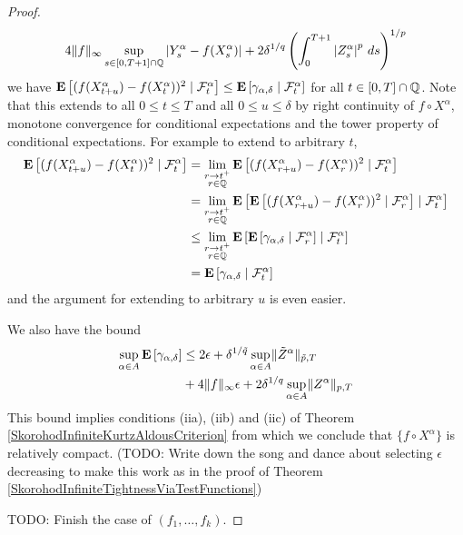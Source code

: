 \begin{proof}
\begin{align*}
4 \norm{f}_\infty \sup_{s \in [0,T+1] \cap \rationals} \abs{Y^\alpha_s - f(X^\alpha_s)} + 
2 \delta^{1/q} \left(\int_0^{T+1} \abs{Z^\alpha_s}^{p} \, ds\right)^{1/p}
\end{align*}
we have $\cexpectationlong{\mathcal{F}^\alpha_t}{(f(X^\alpha_{t+u}) - f(X^\alpha_t))^2} \leq \cexpectationlong{\mathcal{F}^\alpha_t}{\gamma_{\alpha, \delta}}$  for all 
$t \in [0,T] \cap \rationals$.  Note that this extends to all $0 \leq t \leq T$ and all $0 \leq u \leq \delta$ by right continuity of $f \circ X^\alpha$, monotone convergence for conditional expectations and the tower property of conditional expectations.  For example to extend to arbitrary $t$,
\begin{align*}
\cexpectationlong{\mathcal{F}^\alpha_t}{(f(X^\alpha_{t+u}) - f(X^\alpha_t))^2} &=
\lim_{\substack{r \to t^+ \\ r \in \rationals}} \cexpectationlong{\mathcal{F}^\alpha_t}{(f(X^\alpha_{r+u}) - f(X^\alpha_r))^2} \\
&=\lim_{\substack{r \to t^+ \\ r \in \rationals}} \cexpectationlong{\mathcal{F}^\alpha_t}{\cexpectationlong{\mathcal{F}^\alpha_r}{(f(X^\alpha_{r+u}) - f(X^\alpha_r))^2}} \\
&\leq \lim_{\substack{r \to t^+ \\ r \in \rationals}} \cexpectationlong{\mathcal{F}^\alpha_t}{\cexpectationlong{\mathcal{F}^\alpha_r}{\gamma_{\alpha, \delta}}} \\
&= \cexpectationlong{\mathcal{F}^\alpha_t}{\gamma_{\alpha, \delta}} \\
\end{align*}
and the argument for extending to arbitrary $u$ is even easier.

We also have the bound
\begin{align*}
\sup_{\alpha \in A} \expectation{\gamma_{\alpha, \delta}} &\leq 2 \epsilon + \delta^{1/\tilde{q}} \sup_{\alpha \in A} \norm{\tilde{Z}^\alpha}_{\tilde{p}, T} \\
& + 4 \norm{f}_\infty \epsilon + 2 \delta^{1/q} \sup_{\alpha \in A} \norm{Z^\alpha}_{p, T}
\end{align*}
This bound implies conditions (iia), (iib) and (iic) of Theorem \ref{SkorohodInfiniteKurtzAldousCriterion} from which we conclude that $\lbrace f \circ X^\alpha \rbrace$ is relatively compact.  (TODO: Write down the song and dance about selecting $\epsilon$ decreasing to make this work as in the proof of Theorem \ref{SkorohodInfiniteTightnessViaTestFunctions})

TODO: Finish the case of $(f_1, \dotsc, f_k)$.
\end{proof}
